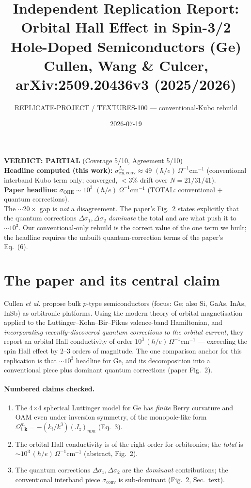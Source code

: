 \documentclass[11pt]{article}
\title{Independent Replication Report:\\
Orbital Hall Effect in Spin-3/2 Hole-Doped Semiconductors (Ge)\\
\large Cullen, Wang \& Culcer, arXiv:2509.20436v3 (2025/2026)}
\author{REPLICATE-PROJECT / TEXTURES-100 --- conventional-Kubo rebuild}
\date{2026-07-19}
\begin{document}
\maketitle

\begin{tcolorbox}[colback=yellow!8!white,colframe=black!60]
\textbf{VERDICT: PARTIAL} \quad (Coverage 5/10, Agreement 5/10)\\[2pt]
\textbf{Headline computed (this work):} $\sigma^{L_z}_{xy,\mathrm{conv}} \approx 49$ $(\hbar/e)\,\Omega^{-1}\mathrm{cm}^{-1}$
(conventional interband Kubo term only; converged, $<3\%$ drift over $N=21/31/41$).\\
\textbf{Paper headline:} $\sigma_{\mathrm{OHE}} \sim 10^{3}$ $(\hbar/e)\,\Omega^{-1}\mathrm{cm}^{-1}$
(TOTAL: conventional $+$ quantum corrections).\\[2pt]
The $\sim\!20\times$ gap is \emph{not} a disagreement. The paper's Fig.~2 states explicitly
that the quantum corrections $\Delta\sigma_1,\Delta\sigma_2$ \emph{dominate} the total and are what
push it to $\sim\!10^3$. Our conventional-only rebuild is the correct value of the one term we built;
the headline requires the unbuilt quantum-correction terms of the paper's Eq.~(6).
\end{tcolorbox}

\section{The paper and its central claim}
Cullen \emph{et al.} propose bulk $p$-type semiconductors (focus: Ge; also Si, GaAs, InAs, InSb)
as orbitronic platforms. Using the modern theory of orbital magnetisation applied to the
Luttinger--Kohn--Bir--Pikus valence-band Hamiltonian, and \emph{incorporating recently-discovered
quantum corrections to the orbital current}, they report an orbital Hall conductivity of order
$10^{3}\,(\hbar/e)\,\Omega^{-1}\mathrm{cm}^{-1}$ --- exceeding the spin Hall effect by 2--3 orders
of magnitude. The one comparison anchor for this replication is that $\sim\!10^3$ headline for Ge,
and its decomposition into a conventional piece plus dominant quantum corrections (paper Fig.~2).

\paragraph{Numbered claims checked.}
\begin{enumerate}
\item[C1.] The 4$\times$4 spherical Luttinger model for Ge has \emph{finite} Berry curvature and OAM
even under inversion symmetry, of the monopole-like form $\Omega^m_{i,\mathbf k}=-(k_i/k^3)(J_z)_{mm}$ (Eq.~3).
\item[C2.] The orbital Hall conductivity is of the right order for orbitronics; the \emph{total} is
$\sim\!10^3\,(\hbar/e)\,\Omega^{-1}\mathrm{cm}^{-1}$ (abstract, Fig.~2).
\item[C3.] The quantum corrections $\Delta\sigma_1,\Delta\sigma_2$ are the \emph{dominant} contributions;
the conventional interband piece $\sigma_{\mathrm{conv}}$ is sub-dominant (Fig.~2, Sec.~text).
\end{enumerate}
\end{document}
